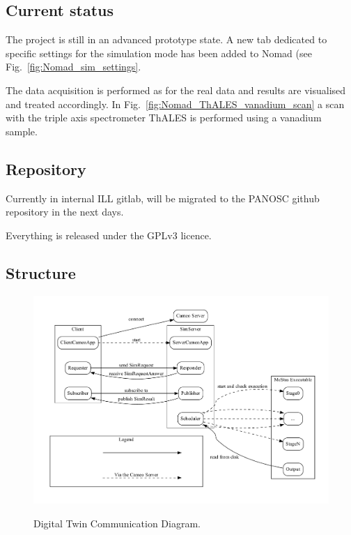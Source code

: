 \documentclass[11pt, a4paper]{article}
\begin{document}
\subsection{Current status}
The project is still in an advanced prototype state.
A new tab dedicated to specific settings for the simulation mode has been added to Nomad (see Fig.~\ref{fig:Nomad_sim_settings}.

The data acquisition is performed as for the real data and results are visualised and treated accordingly. 
In Fig.~\ref{fig:Nomad_ThALES_vanadium_scan} a scan with the triple axis spectrometer ThALES is performed using a vanadium sample.

\subsection{Repository}
Currently in internal ILL gitlab, will be migrated to the PANOSC github repository in the next days.

Everything is released under the GPLv3 licence.

\subsection{Structure}
\begin{figure}[tbh]
\includegraphics[width=\textwidth]{figures/communication.dot.pdf}
\label{fig:DT_comm}
\caption{Digital Twin Communication Diagram.}
\end{figure}
\end{document}
